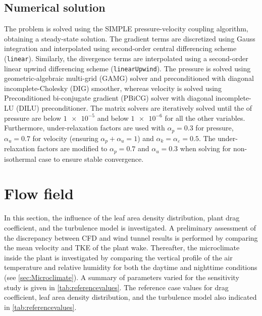 \subsection{Numerical solution}
\label{subsec:numericalsolution_wtcomp}
The problem is solved using the SIMPLE pressure-velocity coupling algorithm, obtaining a steady-state solution. The gradient terms are discretized using Gauss integration and interpolated using second-order central differenc\-ing sch\-eme (\texttt{linear}). Similarly, the divergence terms are interpolated using a second-order linear upwind differenc\-ing scheme (\texttt{linearUpwind}). The pressure is solved using geometric-algebraic multi-grid (GAMG) solver and preconditioned with diagonal incomplete-Cholesky (DIG) smoother, whereas velocity is solved using Preconditioned bi-conjugate gradient (PBiCG) solver with diagonal in\-comp\-lete-LU (DILU) pre\-conditioner. The matrix solvers are iterative\-ly solved until the  of pressure are below $\num{1e-5}$ and below $\num{1e-6}$ for all the other variables. Furthermore, under-relaxation factors are used with $\alpha_p = 0.3$ for pressure, $\alpha_u = 0.7$ for velocity (ensuring $\alpha_p + \alpha_u = 1$) and $\alpha_k = \alpha_{\varepsilon}=0.5$. The under-relaxation factors are modified to $\alpha_p=0.7$ and $\alpha_u=0.3$ when solving for non-iso\-thermal case to ensure stable convergence.

\section{Flow field}
\label{sec:flowfield}
In this section, the influence of the leaf area density distribution, plant drag coefficient, and the turbulence model is investigated. A preliminary assessment of the discrepancy between CFD and wind tunnel results is performed by comparing the mean velocity and TKE of the plant wake. Thereafter, the microclimate inside the plant is investigated by comparing the vertical profile of the air temperature and relative humidity for both the daytime and nighttime conditions (see \cref{sec:Microclimate}). A summary of parameters varied for the sensitivity study is given in \cref{tab:referencevalues}. The reference case values for drag coefficient, leaf area density distribution, and the turbulence model also indicated in \cref{tab:referencevalues}.



